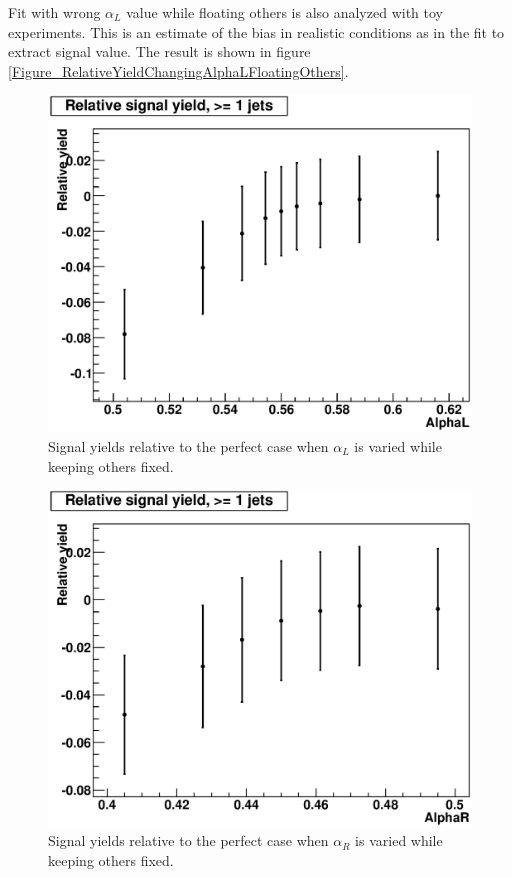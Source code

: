 \documentclass{cmspaper2}
\begin{document}
Fit with wrong $\alpha_L$ value while floating others is also analyzed with toy experiments.
This is an estimate of the bias in realistic conditions as in the fit to extract signal value.
The result is shown in figure \ref{Figure_RelativeYieldChangingAlphaLFloatingOthers}.

\begin{figure}[hbtp]
\begin{center}
\includegraphics[width=150mm]{AlphaL_RelativeSignalYieldGood_1}
\caption{Signal yields relative to the perfect case when $\alpha_L$ is varied while keeping others fixed.}
\label{Figure_RelativeYieldChangingAlphaLOnly}
\end{center}
\end{figure}

\begin{figure}[hbtp]
\begin{center}
\includegraphics[width=150mm]{AlphaR_RelativeSignalYieldGood_1}
\caption{Signal yields relative to the perfect case when $\alpha_R$ is varied while keeping others fixed.}
\label{Figure_RelativeYieldChangingAlphaROnly}
\end{center}
\end{figure}
\end{document}
